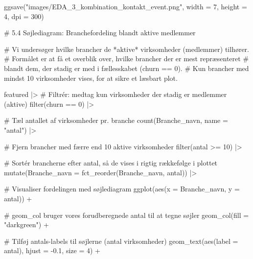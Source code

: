 \documentclass[
  11pt,
  letterpaper,
  DIV=11,
  numbers=noendperiod]{scrartcl}
\newenvironment{Shaded}{\begin{snugshade}}{\end{snugshade}}
\newcommand{\AttributeTok}[1]{\textcolor[rgb]{0.40,0.45,0.13}{#1}}
\newcommand{\CommentTok}[1]{\textcolor[rgb]{0.37,0.37,0.37}{#1}}
\newcommand{\DecValTok}[1]{\textcolor[rgb]{0.68,0.00,0.00}{#1}}
\newcommand{\FloatTok}[1]{\textcolor[rgb]{0.68,0.00,0.00}{#1}}
\newcommand{\FunctionTok}[1]{\textcolor[rgb]{0.28,0.35,0.67}{#1}}
\newcommand{\NormalTok}[1]{\textcolor[rgb]{0.00,0.23,0.31}{#1}}
\newcommand{\SpecialCharTok}[1]{\textcolor[rgb]{0.37,0.37,0.37}{#1}}
\newcommand{\StringTok}[1]{\textcolor[rgb]{0.13,0.47,0.30}{#1}}
\begin{document}
\begin{Shaded}
\begin{Highlighting}[]
\FunctionTok{ggsave}\NormalTok{(}\StringTok{"images/EDA\_3\_kombination\_kontakt\_event.png"}\NormalTok{, }\AttributeTok{width =} \DecValTok{7}\NormalTok{, }\AttributeTok{height =} \DecValTok{4}\NormalTok{, }\AttributeTok{dpi =} \DecValTok{300}\NormalTok{)}

\CommentTok{\# 5.4 Søjlediagram: Branchefordeling blandt aktive medlemmer}


\CommentTok{\# Vi undersøger hvilke brancher de *aktive* virksomheder (medlemmer) tilhører.}
\CommentTok{\# Formålet er at få et overblik over, hvilke brancher der er mest repræsenteret}
\CommentTok{\# blandt dem, der stadig er med i fællesskabet (churn == 0).}
\CommentTok{\# Kun brancher med mindst 10 virksomheder vises, for at sikre et læsbart plot.}

\NormalTok{featured }\SpecialCharTok{|\textgreater{}}
  \CommentTok{\# Filtrér: medtag kun virksomheder der stadig er medlemmer (aktive)}
  \FunctionTok{filter}\NormalTok{(churn }\SpecialCharTok{==} \DecValTok{0}\NormalTok{) }\SpecialCharTok{|\textgreater{}}

  \CommentTok{\# Tæl antallet af virksomheder pr. branche}
  \FunctionTok{count}\NormalTok{(Branche\_navn, }\AttributeTok{name =} \StringTok{"antal"}\NormalTok{) }\SpecialCharTok{|\textgreater{}}

  \CommentTok{\# Fjern brancher med færre end 10 aktive virksomheder}
  \FunctionTok{filter}\NormalTok{(antal }\SpecialCharTok{\textgreater{}=} \DecValTok{10}\NormalTok{) }\SpecialCharTok{|\textgreater{}}

  \CommentTok{\# Sortér brancherne efter antal, så de vises i rigtig rækkefølge i plottet}
  \FunctionTok{mutate}\NormalTok{(}\AttributeTok{Branche\_navn =} \FunctionTok{fct\_reorder}\NormalTok{(Branche\_navn, antal)) }\SpecialCharTok{|\textgreater{}}

  \CommentTok{\# Visualiser fordelingen med søjlediagram}
  \FunctionTok{ggplot}\NormalTok{(}\FunctionTok{aes}\NormalTok{(}\AttributeTok{x =}\NormalTok{ Branche\_navn, }\AttributeTok{y =}\NormalTok{ antal)) }\SpecialCharTok{+}

  \CommentTok{\# geom\_col bruger vores forudberegnede \textquotesingle{}antal\textquotesingle{} til at tegne søjler}
  \FunctionTok{geom\_col}\NormalTok{(}\AttributeTok{fill =} \StringTok{"darkgreen"}\NormalTok{) }\SpecialCharTok{+}

  \CommentTok{\# Tilføj antals{-}labels til søjlerne (antal virksomheder)}
  \FunctionTok{geom\_text}\NormalTok{(}\FunctionTok{aes}\NormalTok{(}\AttributeTok{label =}\NormalTok{ antal), }\AttributeTok{hjust =} \SpecialCharTok{{-}}\FloatTok{0.1}\NormalTok{, }\AttributeTok{size =} \DecValTok{4}\NormalTok{) }\SpecialCharTok{+}


\end{Highlighting}
\end{Shaded}
\end{document}
